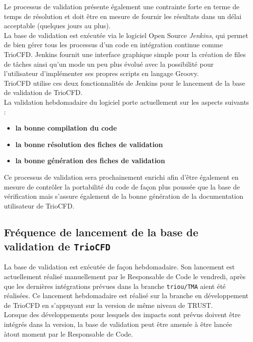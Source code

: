 Le processus de validation présente également une contrainte forte en terme de temps de résolution
et doit être en mesure de fournir les résultats dans un délai acceptable (quelques jours au plus).\\

La base de validation est exécutée via le logiciel Open Source \emph{Jenkins},
qui permet de bien gérer tous les processus d'un code en intégration continue comme TrioCFD.
Jenkins fournit une interface graphique simple pour la création de files de tâches ainsi qu'un mode un peu plus évolué
avec la possibilité pour l'utilisateur d'implémenter ses propres scripts en langage Groovy.\\
TrioCFD utilise ces deux fonctionnalités de Jenkins pour le lancement de la base de validation de TrioCFD.\\
La validation hebdomadaire du logiciel porte actuellement sur les aspects suivants :
\begin{itemize}[label=$\Rightarrow$, font=\LARGE]
   \item \textbf{la bonne compilation du code}
   \item \textbf{la bonne résolution des fiches de validation}
   \item \textbf{la bonne génération des fiches de validation}
\end{itemize}

Ce processus de validation sera prochainement enrichi afin d'être également en mesure de contrôler la portabilité du code de façon plus poussée que la base de vérification mais s'assure également de la bonne génération de la documentation utilisateur de TrioCFD.\\

\subsection{Fréquence de lancement de la base de validation de \texttt{TrioCFD}}
La base de validation est ex\'ecut\'ee de façon hebdomadaire.
Son lancement est actuellement réalisé manuellement par le Responsable de Code le vendredi,
après que les dernières intégrations prévues dans la branche \texttt{triou/TMA} aient été réalisées.
Ce lancement hebdomadaire est réalisé sur la branche en développement de TrioCFD en s'appuyant sur la version de même niveau de TRUST.\\
Lorsque des développements pour lesquels des impacts sont prévus doivent être intégrés dans la version,
la base de validation peut être amenée à être lancée àtout moment par le Responsable de Code.

